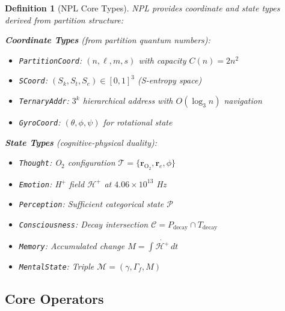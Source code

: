 \documentclass[aps,prd,twocolumn,superscriptaddress,floatfix,nofootinbib]{revtex4-2}
\newtheorem{definition}[theorem]{Definition}
\theoremstyle{remark}
\newcommand{\Sk}{S_k}
\newcommand{\St}{S_t}
\newcommand{\Se}{S_e}
\newcommand{\Pcat}{\mathcal{P}}
\newcommand{\Tcat}{\mathcal{T}}
\newcommand{\Ccat}{\mathcal{C}}
\newcommand{\Gstate}{\Gamma}
\newcommand{\Hfield}{\mathcal{H}^+}
\newcommand{\Pdecay}{P_{\mathrm{decay}}}
\newcommand{\Tdecay}{T_{\mathrm{decay}}}
\newcommand{\Mstate}{\mathcal{M}}
\begin{document}
\begin{definition}[NPL Core Types]
\label{def:npl_types}
NPL provides coordinate and state types derived from partition structure:

\textbf{Coordinate Types} (from partition quantum numbers):
\begin{itemize}
\item \texttt{PartitionCoord}: $(n, \ell, m, s)$ with capacity $C(n) = 2n^2$
\item \texttt{SCoord}: $(\Sk, \St, \Se) \in [0,1]^3$ (S-entropy space)
\item \texttt{TernaryAddr}: $3^k$ hierarchical address with $O(\log_3 n)$ navigation
\item \texttt{GyroCoord}: $(\theta, \phi, \psi)$ for rotational state
\end{itemize}

\textbf{State Types} (cognitive-physical duality):
\begin{itemize}
\item \texttt{Thought}: O$_2$ configuration $\Tcat = \{\mathbf{r}_{\mathrm{O}_2}, \mathbf{r}_e, \phi\}$
\item \texttt{Emotion}: H$^+$ field $\Hfield$ at $4.06 \times 10^{13}$ Hz
\item \texttt{Perception}: Sufficient categorical state $\Pcat$
\item \texttt{Consciousness}: Decay intersection $\Ccat = \Pdecay \cap \Tdecay$
\item \texttt{Memory}: Accumulated change $M = \int \dot{\Hfield} \, dt$
\item \texttt{MentalState}: Triple $\Mstate = (\gamma, \Gstate_f, M)$
\end{itemize}
\end{definition}

\subsection{Core Operators}
\end{document}
